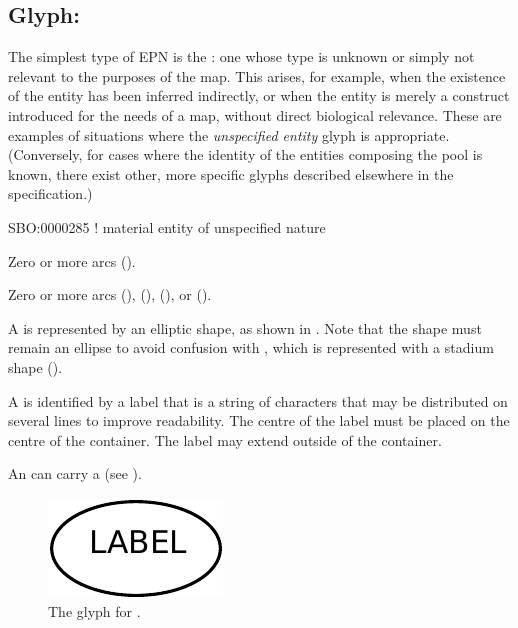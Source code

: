 \subsection{Glyph: }
\label{sec:unspecifiedEntity}

The simplest type of EPN is the : one whose type is unknown or simply not relevant to the purposes of the map.
This arises, for example, when the existence of the entity has been inferred indirectly, or when the entity is merely a construct introduced for the needs of a map, without direct biological relevance.
These are examples of situations where the \emph{unspecified entity} glyph is appropriate.
(Conversely, for cases where the identity of the entities composing the pool is known, there exist other, more specific glyphs described elsewhere in the specification.)

\begin{glyphDescription}

\glyphSboTerm
 SBO:0000285 ! material entity of unspecified nature

\glyphIncoming
Zero or more  arcs ().

\glyphOutgoing
Zero or more  arcs (),  (),  (), or  ().

\glyphContainer
A  is represented by an elliptic shape, as shown in .
Note that the shape must remain an ellipse to avoid confusion with , which is represented with a stadium shape ().

\glyphLabel
A  is identified by a label  that is a string of characters that may be distributed on several lines to improve readability.
The centre of the label must be placed on the centre of the container.
The label may extend outside of the container.

\glyphAux
An  can carry a  (see ).

\end{glyphDescription}

\begin{figure}[H]
  \centering
  \includegraphics{images/build/unspecified.pdf}
  \caption{The \PD glyph for .}
  \label{fig:unspecified}
\end{figure}

